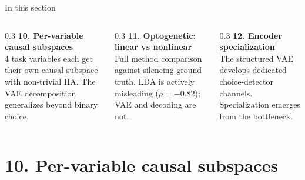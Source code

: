 \documentclass[aspectratio=169,11pt]{beamer}
\begin{document}
\begin{frame}{In this section}
\begin{columns}[T]
\begin{column}{0.3\textwidth}
\textbf{10. Per-variable causal subspaces}\\[0.2em]
{\small 4 task variables each get their own causal subspace with non-trivial IIA. The VAE decomposition generalizes beyond binary choice.}
\end{column}
\begin{column}{0.3\textwidth}
\textbf{11. Optogenetic: linear vs nonlinear}\\[0.2em]
{\small Full method comparison against silencing ground truth. LDA is actively misleading ($\rho = -0.82$); VAE and decoding are not.}
\end{column}
\begin{column}{0.3\textwidth}
\textbf{12. Encoder specialization}\\[0.2em]
{\small The structured VAE develops dedicated choice-detector channels. Specialization emerges from the bottleneck.}
\end{column}
\end{columns}
\end{frame}

\section{10. Per-variable causal subspaces}\hypertarget{sec:10}{}
\end{document}
